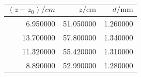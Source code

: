 \begin{tabular}{rrr}
\toprule
$(z-z_0)/\si{cm}$ & $z/\si{\cm}$ & $d/\si{\mm}$ \\
\midrule
6.950000 & 51.050000 & 1.260000 \\
13.700000 & 57.800000 & 1.340000 \\
11.320000 & 55.420000 & 1.310000 \\
8.890000 & 52.990000 & 1.280000 \\
\bottomrule
\end{tabular}
